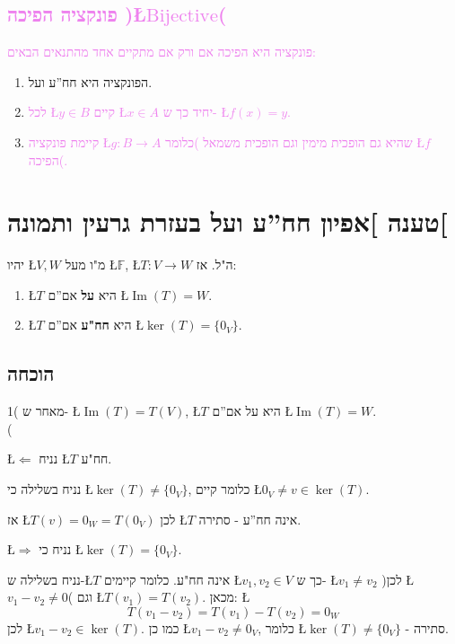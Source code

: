\documentclass[english,hebrew]{article}
\begin{document}
{\begin{minipage}[t]{1\columnwidth - 2\fboxsep - 2\fboxrule}
\subsection{\textcolor{violet}{פונקציה הפיכה )\L{$\text{Bijective}$}(}}

\textcolor{violet}{פונקציה היא הפיכה אם ורק אם מתקיים אחד מהתנאים
הבאים: }
\begin{enumerate}
\item הפונקציה היא חח\textquotedblright ע ועל.
\item \textcolor{violet}{לכל \L{$y\in B$} קיים \L{$x\in A$} יחיד כך ש-
\L{$f(x)=y$}. }
\item \textcolor{violet}{קיימת פונקציה \L{$g:B\to A$} שהיא גם הופכית מימין
וגם הופכית משמאל )כלומר \L{$f$} הפיכה(. }
\end{enumerate}
\end{minipage}}

\section{טענה {]}אפיון חח\textquotedblright ע ועל בעזרת גרעין ותמונה{[}}

יהיו \L{$V,W$} מ"ו מעל \L{$\mathbb{F}$}, \L{$T:V\to W$} ה"ל.
אז: 
\begin{enumerate}
\item \L{$T$} היא \textbf{על} אם\textquotedblright ם \L{$\operatorname{Im}(T)=W$}. 
\item \L{$T$} היא \textbf{חח"ע} אם\textquotedblright ם \L{$\ker(T)=\{0_{V}\}$}. 
\end{enumerate}

\subsection{הוכחה}

1( מאחר ש- \L{$\operatorname{Im}(T)=T(V)$}, \L{$T$} היא על אם\textquotedblright ם
\L{$\operatorname{Im}(T)=W$}. \\

{\endL}( 

\L{$\Leftarrow$} נניח \L{$T$} חח"ע.

נניח בשלילה כי \L{$\ker(T)\not=\{0_{V}\}$}, כלומר קיים \L{$0_{V}\neq v\in\ker(T)$}.

אז \L{$T(v)=0_{W}=T(0_{V})$} לכן \L{$T$} אינה חח\textquotedblright ע
- סתירה.

\L{$\Rightarrow$} נניח כי \L{$\ker(T)=\{0_{V}\}$}.

נניח בשלילה ש-\L{$T$} אינה חח"ע. כלומר קיימים \L{$v_{1},v_{2}\in V$}
כך ש- \L{$v_{1}\neq v_{2}$} )לכן \L{$v_{1}-v_{2}\neq0$}( וגם \L{$T(v_{1})=T(v_{2})$}.
מכאן: \L{%
\[
T(v_{1}-v_{2})=T(v_{1})-T(v_{2})=0_{W}
\]
}%
לכן \L{$v_{1}-v_{2}\in\ker(T)$}. כמו כן \L{$v_{1}-v_{2}\neq0_{V}$},
כלומר \L{$\ker(T)\not=\{0_{V}\}$} - סתירה. 
\end{document}
